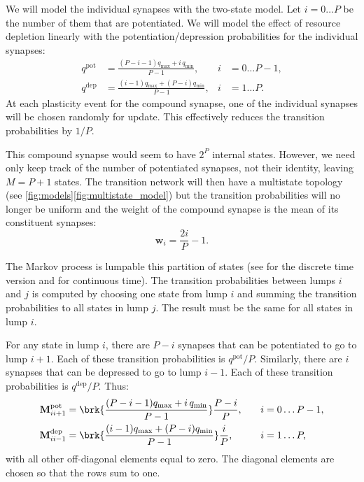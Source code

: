 \documentclass[12pt]{article}
\newcommand{\w}{\mathbf{w}}
\newcommand{\M}{\mathbf{M}}
\newcommand{\pot}{^{\text{pot}}}
\newcommand{\dep}{^{\text{dep}}}
\newcommand{\lmax}{_{\text{max}}}
\newcommand{\lmin}{_{\text{min}}}
\begin{document}
We will model the individual synapses with the two-state model.
Let $i=0\ldots P$ be the number of them that are potentiated.
We will model the effect of resource depletion linearly with the potentiation/depression probabilities for the individual synapses:
%
\begin{equation}\label{eq:depletion}
  \begin{aligned}
    q\pot &= \frac{(P-i-1)q\lmax + i\,q\lmin}{P-1}, \quad& i &= 0 \ldots P-1,\\
    q\dep &= \frac{(i-1)q\lmax + (P-i)q\lmin}{P-1}, & i &= 1 \ldots P.
  \end{aligned}
\end{equation}
%
At each plasticity event for the compound synapse, one of the individual synapses will be chosen randomly for update.
This effectively reduces the transition probabilities by $1/P$.

This compound synapse would seem to have $2^P$ internal states.
However, we need only keep track of the number of potentiated synapses, not their identity, leaving $M=P+1$ states.
The transition network will then have a multistate topology (see \autoref{fig:models}\ref{fig:multistate_model}) but the transition probabilities will no longer be uniform and the weight of the compound synapse is the mean of its constituent synapses:
%
\begin{equation}\label{eq:pooledweight}
  \w_i = \frac{2i}{P}-1.
\end{equation}
%


The Markov process is lumpable \wrt this partition of states (see \cite[\S6.3]{kemeny1960finite} for the discrete time version and \cite{burke1958markovian,Ball1993Lumpability} for continuous time).
The transition probabilities between lumps $i$ and $j$ is computed by choosing one state from lump $i$ and summing the transition probabilities to all states in lump $j$.
The result must be the same for all states in lump $i$.

For any state in lump $i$, there are $P-i$ synapses that can be potentiated to go to lump $i+1$.
Each of these transition probabilities is $q\pot/P$.
Similarly, there are $i$ synapses that can be depressed to go to lump $i-1$.
Each of these transition probabilities is $q\dep/P$.
Thus:
%
\begin{equation}\label{eq:pooledpotdep}
  \begin{aligned}
    \M\pot_{ii+1} &=  \brk{\frac{(P-i-1)q\lmax + i\,q\lmin}{P-1}} \frac{P-i}{P} ,
      \quad& i &= 0 \ldots P-1,\\
    \M\dep_{ii-1} &=  \brk{\frac{(i-1)q\lmax + (P-i)q\lmin}{P-1}} \frac{i}{P} ,
           & i &= 1 \ldots P,
  \end{aligned}
\end{equation}
%
with all other off-diagonal elements equal to zero.
The diagonal elements are chosen so that the rows sum to one.
\end{document}
